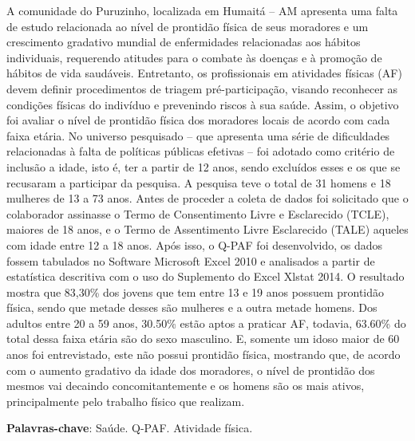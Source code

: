 \documentclass[article,12pt,onesidea,4paper,english,brazil]{abntex2}
\begin{document}
	\noindent A comunidade do Puruzinho, localizada em Humaitá – AM apresenta uma falta de
	estudo relacionada ao nível de prontidão física de seus moradores e um crescimento
	gradativo mundial de enfermidades relacionadas aos hábitos individuais, requerendo
	atitudes para o combate às doenças e à promoção de hábitos de vida saudáveis.
	Entretanto, os profissionais em atividades físicas (AF) devem definir procedimentos
	de triagem pré-participação, visando reconhecer as condições físicas do indivíduo e
	prevenindo riscos à sua saúde. Assim, o objetivo foi avaliar o nível de prontidão
	física dos moradores locais de acordo com cada faixa etária. No universo
	pesquisado – que apresenta uma série de dificuldades relacionadas à falta de
	políticas públicas efetivas – foi adotado como critério de inclusão a idade, isto é, ter
	a partir de 12 anos, sendo excluídos esses e os que se recusaram a participar da
	pesquisa. A pesquisa teve o total de 31 homens e 18 mulheres de 13 a 73 anos.
	Antes de proceder a coleta de dados foi solicitado que o colaborador assinasse o
	Termo de Consentimento Livre e Esclarecido (TCLE), maiores de 18 anos, e o
	Termo de Assentimento Livre Esclarecido (TALE) aqueles com idade entre 12 a 18
	anos. Após isso, o Q-PAF foi desenvolvido, os dados fossem tabulados no Software
	Microsoft Excel 2010 e analisados a partir de estatística descritiva com o uso do
	Suplemento do Excel Xlstat 2014. O resultado mostra que 83,30\% dos jovens que
	tem entre 13 e 19 anos possuem prontidão física, sendo que metade desses são
	mulheres e a outra metade homens. Dos adultos entre 20 a 59 anos, 30.50\% estão
	aptos a praticar AF, todavia, 63.60\% do total dessa faixa etária são do sexo
	masculino. E, somente um idoso maior de 60 anos foi entrevistado, este não possui
	prontidão física, mostrando que, de acordo com o aumento gradativo da idade dos
	moradores, o nível de prontidão dos mesmos vai decaindo concomitantemente e os
	homens são os mais ativos, principalmente pelo trabalho físico que realizam.
	
	\vspace{\onelineskip}
	
	\noindent
	\textbf{Palavras-chave}: Saúde. Q-PAF. Atividade física.
	
\end{document}
